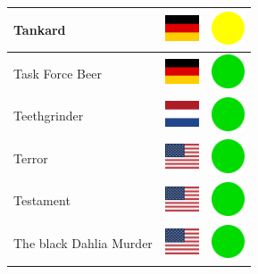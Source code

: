 \documentclass[12pt, a4paper, twoside]{report}
\begin{document}
\begin{center}
\begin{longtable}{|p{5cm}|p{2cm}|p{2cm}|}
Tankard & \includegraphics[width=1cm]{4x3/de} & \includegraphics[width=1cm]{likes/m} \\ \hline
Task Force Beer & \includegraphics[width=1cm]{4x3/de} & \includegraphics[width=1cm]{likes/y} \\ \hline
Teethgrinder & \includegraphics[width=1cm]{4x3/nl} & \includegraphics[width=1cm]{likes/y} \\ \hline
Terror & \includegraphics[width=1cm]{4x3/us} & \includegraphics[width=1cm]{likes/y} \\ \hline
Testament & \includegraphics[width=1cm]{4x3/us} & \includegraphics[width=1cm]{likes/y} \\ \hline
The black Dahlia Murder & \includegraphics[width=1cm]{4x3/us} & \includegraphics[width=1cm]{likes/y} \\ \hline

\end{longtable}
\end{center}
\end{document}
